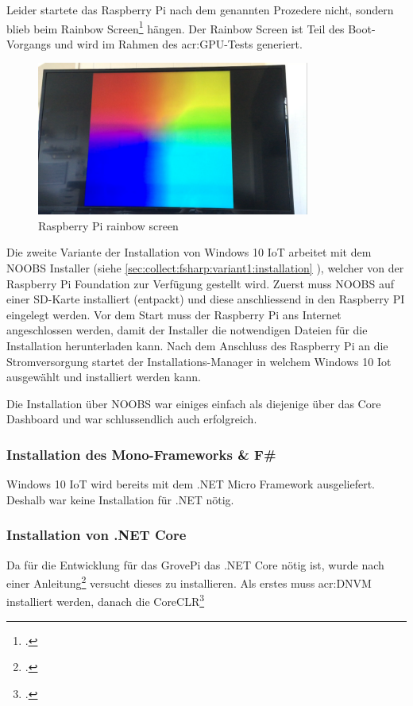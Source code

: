 Leider startete das Raspberry Pi nach dem genannten Prozedere nicht, sondern blieb beim Rainbow Screen\footcite{RPi_Rainbowscreen_2016-04-25} hängen. Der Rainbow Screen ist Teil des Boot-Vorgangs und wird im Rahmen des \gls{acr:GPU}-Tests generiert.

\begin{figure}[H]
  \centering
  \includegraphics[width=0.8\textwidth]{./images/raspberry-rainbow-screen.png}
  \caption{Raspberry Pi rainbow screen}
\end{figure}

Die zweite Variante der Installation von Windows 10 IoT arbeitet mit dem NOOBS Installer (siehe \ref{sec:collect:fsharp:variant1:installation} ), welcher von der Raspberry Pi Foundation zur Verfügung gestellt wird. Zuerst muss NOOBS auf einer SD-Karte installiert (entpackt) und diese anschliessend in den Raspberry PI eingelegt werden. Vor dem Start muss der Raspberry Pi ans Internet angeschlossen werden, damit der Installer die notwendigen Dateien für die Installation herunterladen kann. Nach dem Anschluss des Raspberry Pi an die Stromversorgung startet der Installations-Manager in welchem Windows 10 Iot ausgewählt und installiert werden kann.

Die Installation über NOOBS war einiges einfach als diejenige über das Core Dashboard und war schlussendlich auch erfolgreich.

\subsubsection{Installation des Mono-Frameworks \& F\#}
Windows 10 IoT wird bereits mit dem .NET Micro Framework ausgeliefert. Deshalb war keine Installation für .NET nötig.

\subsubsection{Installation von .NET Core}
Da für die Entwicklung für das GrovePi das .NET Core nötig ist, wurde nach einer Anleitung\footcite{How_to_run_DotNET_Core_Application_on_Pi2} versucht dieses zu installieren. Als erstes muss \gls{acr:DNVM} installiert werden, danach die CoreCLR\footcite{CoreCLR_2016-06-17}


